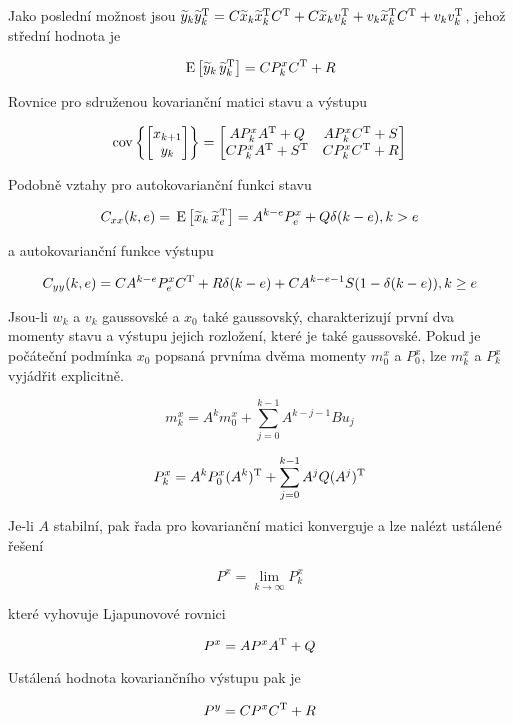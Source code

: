 Jako poslední možnost jsou $\widetilde{y}_{k}\widetilde{y}_{k}^{\mathrm{T}} = C\widetilde{x}_{k}\widetilde{x}_{k}^{\mathrm{T}} C^{\mathrm{T}} + C\widetilde{x}_{k}v_k^{\mathrm{T}} + v_k\widetilde{x}_{k}^{\mathrm{T}} C^{\mathrm{T}}+v_k v_k^{\mathrm{T}}$, jehož střední hodnota je 

\[ \,\mathrm{E}\left[\widetilde{y}_{k}\, \widetilde{y}_{k}^{\mathrm{T}}\right] = CP_k^x C^{\mathrm{T}} + R \]

Rovnice pro sdruženou kovarianční matici stavu a výstupu

\[
\mathrm{cov}\left\{ \begin{bmatrix}x_{k+1} \\ y_k\end{bmatrix} \right\} =
\begin{bmatrix}
AP_k^x A^{\mathrm{T}}+Q & AP_k^x C^{\mathrm{T}} + S\\
CP_k^x A^{\mathrm{T}} + S^{\mathrm{T}} & CP_k^x C^{\mathrm{T}} + R
\end{bmatrix}
\]

Podobně vztahy pro autokovarianční funkci stavu

\[ C_{xx}(k,e) = \,\mathrm{E}\left[\widetilde{x}_k\, \widetilde{x}_e^{\mathrm{T}}\right]=A^{k-e}P_e^x+Q\delta(k-e), k>e \]

a autokovarianční funkce výstupu

\[ C_{yy}(k,e) = CA^{k-e}P_e^x C^{\mathrm{T}} + R\delta(k-e) + CA^{k-e-1}S(1-\delta(k-e)), k\geq e \]

Jsou-li $w_k$ a $v_k$ gaussovské a $x_0$ také gaussovský, charakterizují první dva momenty stavu a výstupu jejich rozložení, které je také gaussovské. Pokud je počáteční podmínka $x_0$ popsaná prvníma dvěma momenty $m_0^x$ a $P_0^x$, lze $m_k^x$ a $P_k^x$ vyjádřit explicitně.

\[ m_k^x = A^k m_0^x+\sum_{j=0}^{k-1}A^{k-j-1}Bu_j \]

\[ P_k^x = A^k P_0^x (A^k)^{\mathrm{T}}+\sum_{j=0}^{k-1}A^j Q (A^j)^{\mathrm{T}} \]

Je-li $A$ stabilní, pak řada pro kovarianční matici konverguje a lze nalézt ustálené řešení

\[ P^x = \lim_{k\to\infty} P_k^x \]

které vyhovuje Ljapunovové rovnici

\[ P^x = AP^xA^{\mathrm{T}} + Q \]

Ustálená hodnota kovariančního výstupu pak je

\[ P^y = CP^x C^{\mathrm{T}} + R \]